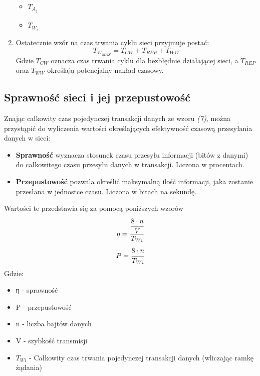 \documentclass[a4paper,twoside]{article}
\begin{document}
\begin{enumerate}
\begin{itemize}
			\item $ T_{A_j} $ 
			\item $ T_{W_i} $ 
		\end{itemize}
		\item Ostatecznie wzór na czas trwania cyklu sieci przyjmuje postać:
		\begin{equation}
			T_{W_{MAX}}=T_{CW}+T_{REP}+T_{WW}
		\end{equation}
		Gdzie $ T_{CW} $ oznacza czas trwania cyklu dla bezbłędnie działającej sieci, a $ T_{REP} $ oraz $ T_{WW} $ określają potencjalny nakład czasowy.
	\end{enumerate}

	\subsection{Sprawność sieci i jej przepustowość}
	Znając całkowity czas pojedynczej transakcji danych ze wzoru \textit{(7)}, można przystąpić do wyliczenia wartości określających efektywność czasową przesyłania danych w sieci:
	\begin{itemize}
		\item \textbf{Sprawność} wyznacza stosunek czasu przesyłu informacji (bitów z danymi) do całkowitego czasu przesyłu danych w transakcji. Liczona w procentach.
		\item \textbf{Przepustowość} pozwala określić maksymalną ilość informacji, jaka zostanie przesłana w jednostce czasu. Liczona w bitach na sekundę.
	\end{itemize}
	
	Wartości te przedstawia się za pomocą poniższych wzorów
	\begin{equation}
	\eta = \cfrac{\cfrac{8\cdot n}{V}}{T_{Wi}}   
	\end{equation}
	\begin{equation}
	P = \cfrac{8\cdot n}{T_{Wi}}
	\end{equation}
\newpage
	Gdzie:
	\begin{itemize}
		\item η - sprawność
		\item P - przepustowość
		\item n - liczba bajtów danych
		\item V - szybkość transmisji
		\item $ T_{Wi} $ - Całkowity czas trwania pojedynczej transakcji danych (wliczając ramkę żądania)
	\end{itemize}
	
\end{document}
